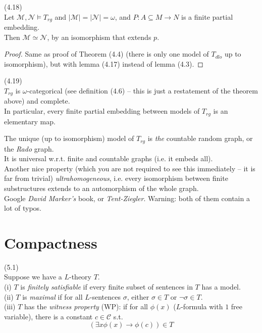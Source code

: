 \documentclass[a4paper]{article}
\begin{document}
\begin{thm} (4.18)\\
    Let $\mathcal{M},\mathcal{N} \vDash T_{rg}$ and $|\mathcal{M}| = |\mathcal{N}| = \omega$, and $P:A \subseteq M \to N$ is a finite partial embedding.\\
    Then $\mathcal{M} \simeq \mathcal{N}$, by an isomorphism that extends $p$.
    \begin{proof}
        Same as proof of Theorem (4.4) (there is only one model of $T_{dlo}$ up to isomorphism), but with lemma (4.17) instead of lemma (4.3).
    \end{proof}
\end{thm}

\begin{coro} (4.19)\\
    $T_{rg}$ is $\omega$-categorical (see definition (4.6) -- this is just a restatement of the theorem above) and complete.\\
    In particular, every finite partial embedding between models of $T_{rg}$ is an elementary map.
\end{coro}

\begin{rem}
    The unique (up to isomorphism) model of $T_{rg}$ is \emph{the} countable random graph, or the \emph{Rado} graph.\\
    It is universal w.r.t. finite and countable graphs (i.e. it embeds all).\\
    Another nice property (which you are not required to see this immediately -- it is far from trivial) \emph{ultrahomogeneous}, i.e. every isomorphism between finite substructures extends to an automorphism of the whole graph.\\
    Google \emph{David Marker's} book, or \emph{Tent-Ziegler}. Warning: both of them contain a lot of typos.
\end{rem}

\newpage

\section{Compactness}

\begin{defi} (5.1)\\
    Suppose we have a $L$-theory $T$.\\
    (i) $T$ is \emph{finitely satisfiable} if every finite subset of sentences in $T$ has a model.\\
    (ii) $T$ is \emph{maximal} if for all $L$-sentences $\sigma$, either $\sigma \in T$ or $\neg\sigma \in T$.\\
    (iii) $T$ has the \emph{witness property} (WP): if for all $\phi(x)$ ($L$-formula with $1$ free variable), there is a constant $c \in \mathcal{C}$ s.t.
    $$(\exists x \phi(x) \to \phi(c)) \in T$$
\end{defi}
\end{document}

